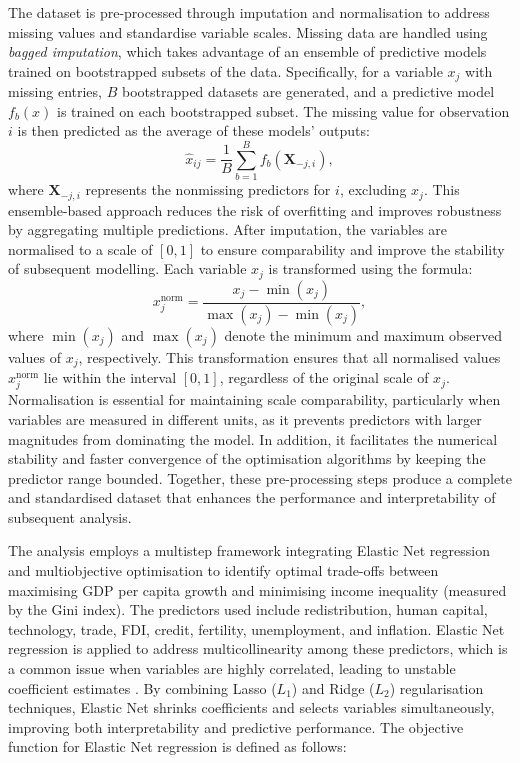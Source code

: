 \documentclass[12pt]{article}
\begin{document}


The dataset is pre-processed through imputation and normalisation to address missing values and standardise variable scales. Missing data are handled using \textit{bagged imputation}, which takes advantage of an ensemble of predictive models trained on bootstrapped subsets of the data. Specifically, for a variable \(x_j\) with missing entries, \(B\) bootstrapped datasets are generated, and a predictive model \(f_b(x)\) is trained on each bootstrapped subset. The missing value for observation \(i\) is then predicted as the average of these models' outputs:
\[
\hat{x}_{ij} = \frac{1}{B} \sum_{b=1}^{B} f_b(\mathbf{X}_{-j,i}),
\]
where \(\mathbf{X}_{-j,i}\) represents the nonmissing predictors for \(i\), excluding \(x_j\). This ensemble-based approach reduces the risk of overfitting and improves robustness by aggregating multiple predictions. After imputation, the variables are normalised to a scale of \([0, 1]\) to ensure comparability and improve the stability of subsequent modelling. Each variable \(x_j\) is transformed using the formula:
\[
x_j^{\text{norm}} = \frac{x_j - \min(x_j)}{\max(x_j) - \min(x_j)},
\]
where \(\min(x_j)\) and \(\max(x_j)\) denote the minimum and maximum observed values of \(x_j\), respectively. This transformation ensures that all normalised values \(x_j^{\text{norm}}\) lie within the interval \([0, 1]\), regardless of the original scale of \(x_j\). Normalisation is essential for maintaining scale comparability, particularly when variables are measured in different units, as it prevents predictors with larger magnitudes from dominating the model. In addition, it facilitates the numerical stability and faster convergence of the optimisation algorithms by keeping the predictor range bounded. Together, these pre-processing steps produce a complete and standardised dataset that enhances the performance and interpretability of subsequent analysis.

The analysis employs a multistep framework integrating Elastic Net regression and multiobjective optimisation to identify optimal trade-offs between maximising GDP per capita growth and minimising income inequality (measured by the Gini index). The predictors used include redistribution, human capital, technology, trade, FDI, credit, fertility, unemployment, and inflation. Elastic Net regression is applied to address multicollinearity among these predictors, which is a common issue when variables are highly correlated, leading to unstable coefficient estimates \parencite{tay2023elastic}. By combining Lasso (\(L_1\)) and Ridge (\(L_2\)) regularisation techniques, Elastic Net shrinks coefficients and selects variables simultaneously, improving both interpretability and predictive performance. The objective function for Elastic Net regression is defined as follows:
\end{document}
